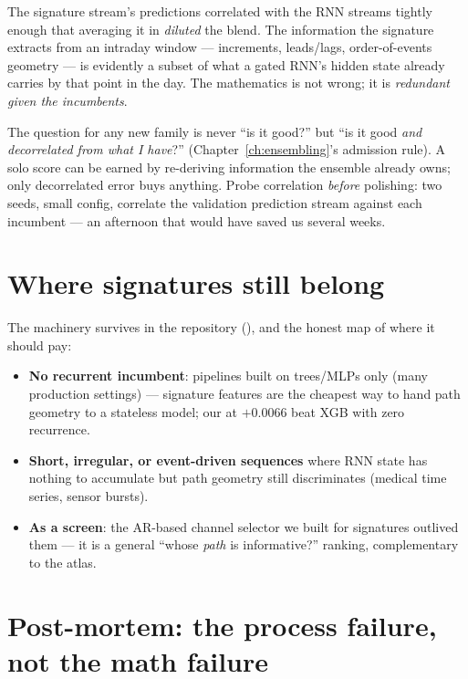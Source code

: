 The signature stream's predictions correlated with the RNN streams tightly
enough that averaging it in \emph{diluted} the blend. The information the
signature extracts from an intraday window --- increments, leads/lags,
order-of-events geometry --- is evidently a subset of what a gated RNN's
hidden state already carries by that point in the day. The mathematics is
not wrong; it is \emph{redundant given the incumbents}.

\begin{keybox}
The question for any new family is never ``is it good?'' but ``is it good
\emph{and decorrelated from what I have}?''
(Chapter~\ref{ch:ensembling}'s admission rule). A solo score can be earned
by re-deriving information the ensemble already owns; only decorrelated
error buys anything. Probe correlation \emph{before} polishing: two seeds,
small config, correlate the validation prediction stream against each
incumbent --- an afternoon that would have saved us several weeks.
\end{keybox}

\section{Where signatures still belong}

The machinery survives in the repository (), and
the honest map of where it should pay:

\begin{itemize}
\item \textbf{No recurrent incumbent}: pipelines built on trees/MLPs only
  (many production settings) --- signature features are the cheapest way
  to hand path geometry to a stateless model; our  at
  $+0.0066$ beat XGB with zero recurrence.
\item \textbf{Short, irregular, or event-driven sequences} where RNN state
  has nothing to accumulate but path geometry still discriminates
  (medical time series, sensor bursts).
\item \textbf{As a screen}: the AR-based channel selector we built for
  signatures outlived them --- it is a general ``whose \emph{path} is
  informative?'' ranking, complementary to the atlas.
\end{itemize}

\section{Post-mortem: the process failure, not the math failure}


